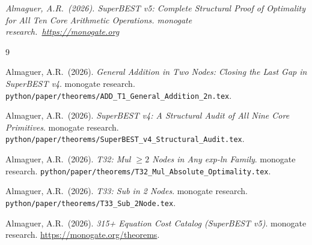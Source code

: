 \documentclass[12pt,a4paper]{article}
\theoremstyle{definition}
\begin{document}
\bigskip
\noindent\textit{Almaguer, A.R.\ (2026).
SuperBEST v5: Complete Structural Proof of Optimality for All Ten Core Arithmetic Operations.
monogate research.\ \url{https://monogate.org}}

\begin{thebibliography}{9}

Almaguer, A.R.\ (2026).
\textit{General Addition in Two Nodes: Closing the Last Gap in SuperBEST v4}.
monogate research.
\texttt{python/paper/theorems/ADD\_T1\_General\_Addition\_2n.tex}.

Almaguer, A.R.\ (2026).
\textit{SuperBEST v4: A Structural Audit of All Nine Core Primitives}.
monogate research.
\texttt{python/paper/theorems/SuperBEST\_v4\_Structural\_Audit.tex}.

Almaguer, A.R.\ (2026).
\textit{T32: Mul $\ge 2$ Nodes in Any exp-ln Family}.
monogate research.
\texttt{python/paper/theorems/T32\_Mul\_Absolute\_Optimality.tex}.

Almaguer, A.R.\ (2026).
\textit{T33: Sub in 2 Nodes}.
monogate research.
\texttt{python/paper/theorems/T33\_Sub\_2Node.tex}.

Almaguer, A.R.\ (2026).
\textit{315+ Equation Cost Catalog (SuperBEST v5)}.
monogate research.
\url{https://monogate.org/theorems}.

\end{thebibliography}
\end{document}
